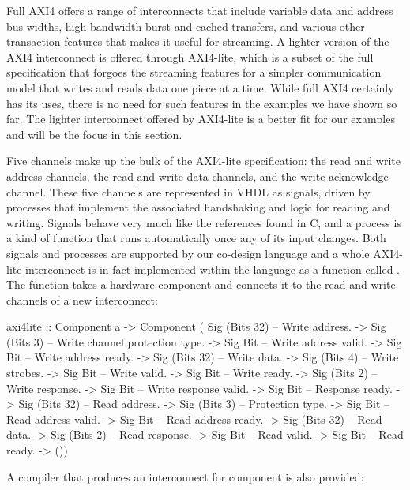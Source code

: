 \documentclass[../paper.tex]{subfiles}
\begin{document}
Full AXI4 offers a range of interconnects that include variable data and address bus widths, high bandwidth burst and cached transfers, and various other transaction features that makes it useful for streaming. A lighter version of the AXI4 interconnect is offered through AXI4-lite, which is a subset of the full specification that forgoes the streaming features for a simpler communication model that writes and reads data one piece at a time. While full AXI4 certainly has its uses, there is no need for such features in the examples we have shown so far. The lighter interconnect offered by AXI4-lite is a better fit for our examples and will be the focus in this section.

Five channels make up the bulk of the AXI4-lite specification: the read and write address channels, the read and write data channels, and the write acknowledge channel. These five channels are represented in VHDL as signals, driven by processes that implement the associated handshaking and logic for reading and writing. Signals behave very much like the references found in C, and a process is a kind of function that runs automatically once any of its input changes. Both signals and processes are supported by our co-design language and a whole AXI4-lite interconnect is in fact implemented within the language as a function called . The function takes a hardware component and connects it to the read and write channels of a new interconnect:

\begin{code}
axi4lite ::
     Component a
  -> Component (
          Sig (Bits 32) -- Write address.
       -> Sig (Bits 3)  -- Write channel protection type.
       -> Sig Bit       -- Write address valid.
       -> Sig Bit       -- Write address ready.
       -> Sig (Bits 32) -- Write data.
       -> Sig (Bits 4)  -- Write strobes.
       -> Sig Bit       -- Write valid.
       -> Sig Bit       -- Write ready.
       -> Sig (Bits 2)  -- Write response.
       -> Sig Bit       -- Write response valid.
       -> Sig Bit       -- Response ready.
       -> Sig (Bits 32) -- Read address.
       -> Sig (Bits 3)  -- Protection type.
       -> Sig Bit       -- Read address valid.
       -> Sig Bit       -- Read address ready.
       -> Sig (Bits 32) -- Read data.
       -> Sig (Bits 2)  -- Read response.
       -> Sig Bit       -- Read valid.
       -> Sig Bit       -- Read ready.    
       -> ())
\end{code}

\noindent A compiler that produces an interconnect for component is also provided:
\end{document}
